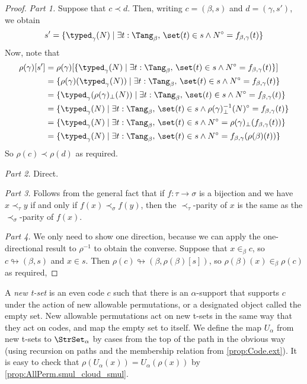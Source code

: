 \begin{proof}
  \emph{Part 1.}
  Suppose that \( c \prec d \).
  Then, writing \( c = (\beta, s) \) and \( d = (\gamma, s') \), we obtain
  \[ s' = \{ \typed_\gamma(N) \mid \exists t : \Tang_\beta,\, \set(t) \in s \wedge N^\circ = f_{\beta,\gamma}(t) \} \]
  Now, note that
  \begin{align*}
    \rho(\gamma)[s']
    &= \rho(\gamma)[\{ \typed_\gamma(N) \mid \exists t : \Tang_\beta,\, \set(t) \in s \wedge N^\circ = f_{\beta,\gamma}(t) \}] \\
    &= \{ \rho(\gamma)(\typed_\gamma(N)) \mid \exists t : \Tang_\beta,\, \set(t) \in s \wedge N^\circ = f_{\beta,\gamma}(t) \} \\
    &= \{ \typed_\gamma(\rho(\gamma)_\bot(N)) \mid \exists t : \Tang_\beta,\, \set(t) \in s \wedge N^\circ = f_{\beta,\gamma}(t) \} \\
    &= \{ \typed_\gamma(N) \mid \exists t : \Tang_\beta,\, \set(t) \in s \wedge \rho(\gamma)_\bot^{-1}(N)^\circ = f_{\beta,\gamma}(t) \} \\
    &= \{ \typed_\gamma(N) \mid \exists t : \Tang_\beta,\, \set(t) \in s \wedge N^\circ = \rho(\gamma)_\bot(f_{\beta,\gamma}(t)) \} \\
    &= \{ \typed_\gamma(N) \mid \exists t : \Tang_\beta,\, \set(t) \in s \wedge N^\circ = f_{\beta,\gamma}(\rho(\beta)(t)) \}
  \end{align*}
  So \( \rho(c) \prec \rho(d) \) as required.

  \emph{Part 2.}
  Direct.

  \emph{Part 3.}
  Follows from the general fact that if \( f : \tau \to \sigma \) is a bijection and we have \( x \prec_\tau y \) if and only if \( f(x) \prec_\sigma f(y) \), then the \( \prec_\tau \)-parity of \( x \) is the same as the \( \prec_\sigma \)-parity of \( f(x) \).

  \emph{Part 4.}
  We only need to show one direction, because we can apply the one-directional result to \( \rho^{-1} \) to obtain the converse.
  Suppose that \( x \in_\beta c \), so \( c \looparrowright (\beta, s) \) and \( x \in s \).
  Then \( \rho(c) \looparrowright (\beta, \rho(\beta)[s]) \), so \( \rho(\beta)(x) \in_\beta \rho(c) \) as required,
\end{proof}
\begin{definition}
  \label{def:NewTSet}
  A \emph{new t-set} is an even code \( c \) such that there is an \( \alpha \)-support that supports \( c \) under the action of new allowable permutations, or a designated object called the empty set.
  New allowable permutations act on new t-sets in the same way that they act on codes, and map the empty set to itself.
  We define the map \( U_\alpha \) from new t-sets to \( \StrSet_\alpha \) by cases from the top of the path in the obvious way (using recursion on paths and the membership relation from \cref{prop:Code.ext}).
  It is easy to check that \( \rho(U_\alpha(x)) = U_\alpha(\rho(x)) \) by \cref{prop:AllPerm.smul_cloud_smul}.
\end{definition}
